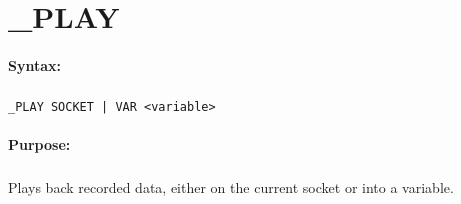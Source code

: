 
\newpage
\section{\_PLAY}
\label{cmd:_PLAY}

\paragraph{Syntax:}
\subparagraph{}
\texttt{\_PLAY SOCKET | VAR <variable>}

\paragraph{Purpose:}
\subparagraph{}
Plays back recorded data, either on the current socket 
or into a variable.